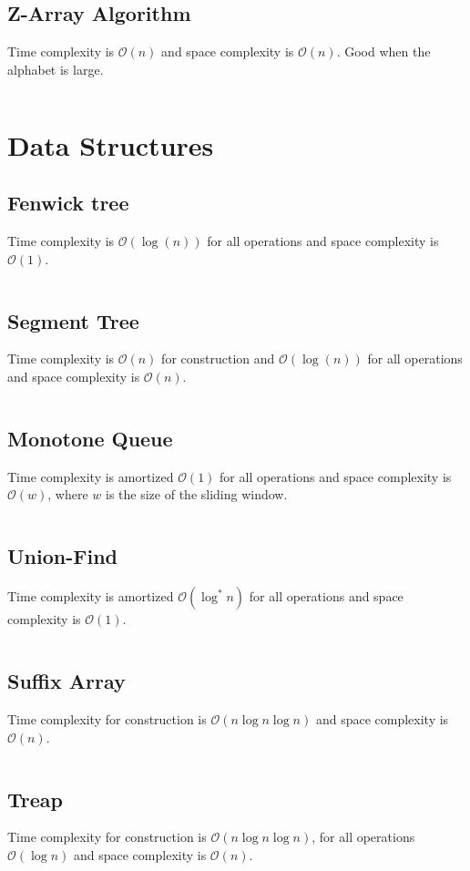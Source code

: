 \documentclass[8pt,a4paper,landscape,oneside]{amsart}
\newcommand{\code}[1]{\inputminted[fontsize=\normalsize,baselinestretch=1]{java}{code/#1}}
\newcommand{\bigO}{\mathcal{O}}
\begin{document}
\begin{multicols*}{3}
  \subsection{Z-Array Algorithm}
  Time complexity is $\bigO(n)$ and space complexity is $\bigO(n)$. Good when the alphabet is large.
  \code{Structures/ZArray.java}
  
  
\section{Data Structures}
  \subsection{Fenwick tree}
  Time complexity is $\bigO(\log(n))$ for all operations and space complexity is $\bigO(1)$.
  \code{Structures/Fenwick.java}
  
  \subsection{Segment Tree}
  Time complexity is $\bigO(n)$ for construction and $\bigO(\log(n))$ for all operations and space complexity is $\bigO(n)$.
  \code{Structures/SegmentTreeRMQ.java}
  
  \subsection{Monotone Queue}
  Time complexity is amortized $\bigO(1)$ for all operations and space complexity is $\bigO(w)$, where $w$ is the size of the sliding window.
  \code{Structures/MinMonoQueue.java}
  
  \subsection{Union-Find}
  Time complexity is amortized $\bigO(\log^*{n})$ for all operations and space complexity is $\bigO(1)$.
  \code{Structures/UnionFind.java}
  
  \subsection{Suffix Array}
  Time complexity for construction is $\bigO(n\log{n}\log{n})$ and space complexity is $\bigO(n)$.
  \code{Structures/SuffixArray.java}
  
  \subsection{Treap}
  Time complexity for construction is $\bigO(n\log{n}\log{n})$, for all operations $\bigO(\log{n})$ and space complexity is $\bigO(n)$.
  \code{Structures/Treap.java}
  

\end{multicols*}
\end{document}
